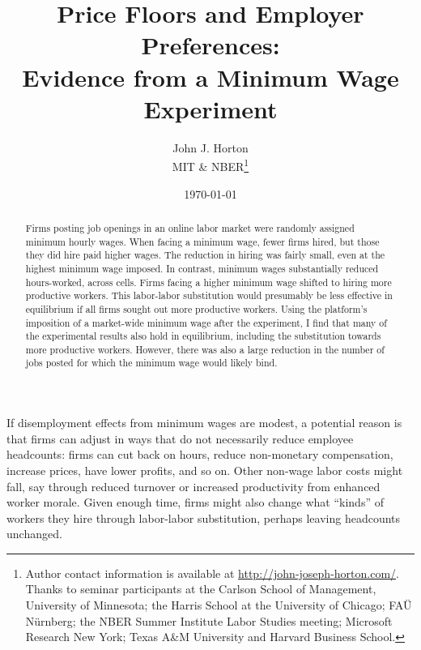 \documentclass[AER]{AEA}
\title{Price Floors and Employer Preferences: \\ Evidence from a Minimum Wage Experiment}
\author{John J. Horton \\ MIT \& NBER\footnote{Author contact information is available at \href{http://john-joseph-horton.com/}{http://john-joseph-horton.com/}.
    Thanks to seminar participants at the Carlson School of Management, University of Minnesota; the Harris School at the
    University of Chicago; FA\"{U} N\"{u}rnberg; the NBER Summer Institute Labor Studies meeting; Microsoft Research New York; Texas A\&M University and Harvard Business School. 
}}
\begin{document}
\date{\today}
\setcounter{page}{117}
\Keywords{}

\begin{abstract}
\noindent Firms posting job openings in an online labor market were randomly assigned minimum hourly wages.
When facing a minimum wage, fewer firms hired, but those they did hire paid higher wages. 
The reduction in hiring was fairly small, even at the highest minimum wage imposed.  
In contrast, minimum wages substantially reduced hours-worked, across cells.
Firms facing a higher minimum wage shifted to hiring more productive workers.
This labor-labor substitution would presumably be less effective in equilibrium if all firms sought out more productive workers.
Using the platform's imposition of a market-wide minimum wage after the experiment, I find that many of the experimental results also hold in equilibrium, including the substitution towards more productive workers.
However, there was also a large reduction in the number of jobs posted for which the minimum wage would likely bind.
\end{abstract} 

\maketitle


If disemployment effects from minimum wages are modest, a potential reason is that firms can adjust in ways that do not necessarily reduce employee headcounts: 
firms can cut back on hours, reduce non-monetary compensation, increase prices, have lower profits, and so on.
Other non-wage labor costs might fall, say through reduced turnover or increased productivity from enhanced worker morale.
Given enough time, firms might also change what ``kinds'' of workers they hire through labor-labor substitution, perhaps leaving headcounts unchanged.
\end{document}
